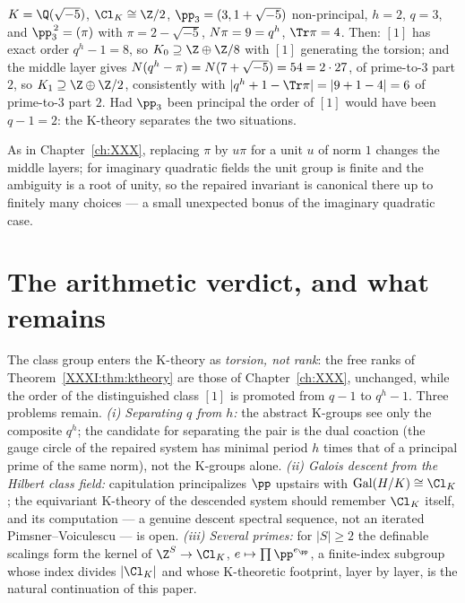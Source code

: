 \begin{example}\label{XXXI:ex:sqrt5}
$K=\Q(\sqrt{-5})$, $\Cl_K\cong\Z/2$, $\pp_3=(3,1+\sqrt{-5})$ non-principal, $h=2$,
$q=3$, and $\pp_3^{\,2}=(\pi)$ with $\pi=2-\sqrt{-5}$, $N\pi=9=q^h$, $\Tr\pi=4$. Then:
$[1]$ has exact order $q^h-1=8$, so $K_0\supseteq\Z\oplus\Z/8$ with $[1]$ generating the
torsion; and the middle layer gives
$N(q^h-\pi)=N(7+\sqrt{-5})=54=2\cdot27$, of prime-to-$3$ part $2$, so
$K_1\supseteq\Z\oplus\Z/2$, consistently with
$|q^h+1-\Tr\pi|=|9+1-4|=6$ of prime-to-$3$ part $2$. Had $\pp_3$ been principal the
order of $[1]$ would have been $q-1=2$: the K-theory separates the two situations.
\end{example}

\begin{remark}\label{XXXI:rem:units}
As in Chapter~\ref{ch:XXX}, replacing $\pi$ by $u\pi$ for a unit $u$ of norm $1$ changes the middle
layers; for imaginary quadratic fields the unit group is finite and the ambiguity is a
root of unity, so the repaired invariant is canonical there up to finitely many choices
--- a small unexpected bonus of the imaginary quadratic case.
\end{remark}

\section{The arithmetic verdict, and what remains}\label{XXXI:sec:verdict}

The class group enters the K-theory as \emph{torsion, not rank}: the free ranks of
Theorem~\ref{XXXI:thm:ktheory} are those of Chapter~\ref{ch:XXX}, unchanged, while the order of the
distinguished class $[1]$ is promoted from $q-1$ to $q^{h}-1$. Three problems remain.
\emph{(i) Separating $q$ from $h$:} the abstract K-groups see only the composite $q^h$;
the candidate for separating the pair is the dual coaction (the gauge circle of the
repaired system has minimal period $h$ times that of a principal prime of the same norm),
not the K-groups alone. \emph{(ii) Galois descent from the Hilbert class field:}
capitulation principalizes $\pp$ upstairs with $\mathrm{Gal}(H/K)\cong\Cl_K$; the
equivariant K-theory of the descended system should remember $\Cl_K$ itself, and its
computation --- a genuine descent spectral sequence, not an iterated
Pimsner--Voiculescu --- is open. \emph{(iii) Several primes:} for $|S|\ge2$ the definable
scalings form the kernel of $\Z^S\to\Cl_K$, $e\mapsto\prod\pp^{e_\pp}$, a finite-index
subgroup whose index divides $|\Cl_K|$ and whose K-theoretic footprint, layer by layer, is
the natural continuation of this paper.

